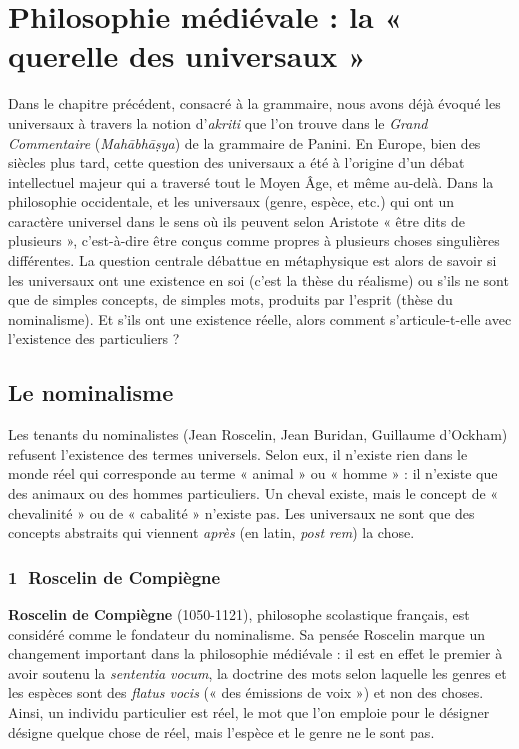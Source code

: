 \section{Philosophie médiévale : la « querelle des universaux »}
Dans le chapitre précédent, consacré à la grammaire, nous avons déjà évoqué les universaux à travers la notion d’\textit{akriti} que l’on trouve dans le \textit{Grand Commentaire} (\textit{Mahābhāṣya}) de la grammaire de Panini. En Europe, bien des siècles plus tard, cette question des universaux a été à l’origine d’un débat intellectuel majeur qui a traversé tout le Moyen Âge, et même au-delà. Dans la philosophie occidentale, et les universaux (genre, espèce, etc.) qui ont un caractère universel dans le sens où ils peuvent selon Aristote « être dits de plusieurs », c’est-à-dire être conçus comme propres à plusieurs choses singulières différentes. La question centrale débattue en métaphysique est alors de savoir si les universaux ont une existence en soi (c’est la thèse du réalisme) ou s’ils ne sont que de simples concepts, de simples mots, produits par l’esprit (thèse du nominalisme). Et s’ils ont une existence réelle, alors comment s’articule-t-elle avec l’existence des particuliers ?

\subsection{Le nominalisme}
Les tenants du nominalistes (Jean Roscelin, Jean Buridan, Guillaume d’Ockham) refusent l’existence des termes universels. Selon eux, il n’existe rien dans le monde réel qui corresponde au terme « animal »
 ou « homme » : il n’existe que des animaux ou des hommes particuliers. Un cheval existe, mais le concept de « chevalinité » ou de « cabalité » n’existe pas. Les universaux ne sont que des concepts abstraits qui viennent \textit{après} (en latin, \textit{post rem}) la chose.

\subsubsection*{\textcircled{\scriptsize 1} Roscelin de Compiègne}
\textbf{Roscelin de Compiègne} (1050-1121), philosophe scolastique français, est considéré comme le fondateur du nominalisme. Sa pensée Roscelin marque un changement important dans la philosophie médiévale : il est en effet le premier à avoir soutenu la \textit{sententia vocum}, la doctrine des mots selon laquelle les genres et les espèces sont des \textit{flatus vocis} (« des émissions de voix ») et non des choses. Ainsi, un individu particulier est réel, le mot que l’on emploie pour le désigner désigne quelque chose de réel, mais l’espèce et le genre ne le sont pas.

